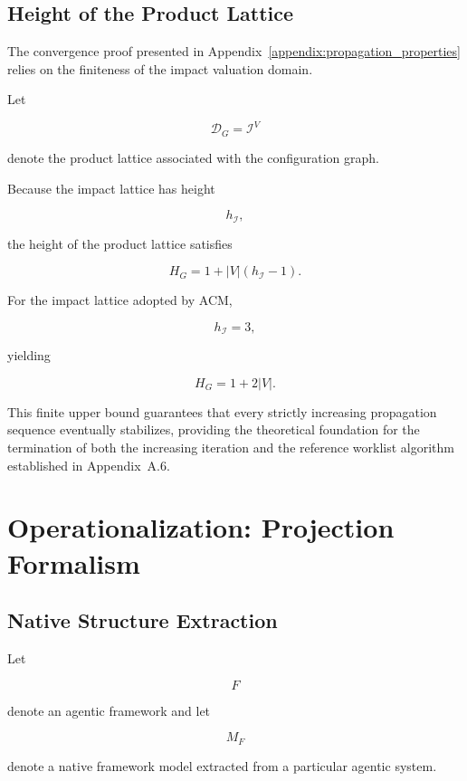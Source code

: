 \documentclass[10pt]{article}
\begin{document}
\subsection{Height of the Product Lattice}
\label{appendix:lattice_height}

The convergence proof presented in Appendix~\ref{appendix:propagation_properties}
relies on the finiteness of the impact valuation domain.

Let

\[
\mathcal D_G
=
\mathcal I^{V}
\]

denote the product lattice associated with the configuration graph.

Because the impact lattice has height

\[
h_{\mathcal I},
\]

the height of the product lattice satisfies

\begin{equation}
	\label{eq:product_lattice_height}
	H_G
	=
	1
	+
	|V|
	\left(
	h_{\mathcal I}-1
	\right).
\end{equation}

For the impact lattice adopted by ACM,

\[
h_{\mathcal I}=3,
\]

yielding

\[
H_G
=
1+2|V|.
\]

This finite upper bound guarantees that every strictly increasing propagation
sequence eventually stabilizes, providing the theoretical foundation for the
termination of both the increasing iteration and the reference worklist
algorithm established in Appendix~A.6.

\section{Operationalization: Projection Formalism}
\label{appendix:projection_formalism}
\subsection{Native Structure Extraction}

Let

\[
F
\]

denote an agentic framework and let

\[
M_F
\]

denote a native framework model extracted from a particular agentic system.
\end{document}
